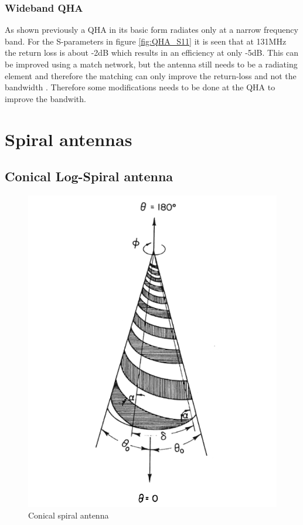\subsubsection{Wideband QHA}
As shown previously a QHA in its basic form radiates only at a narrow frequency band. For the S-parameters in figure \ref{fig:QHA_S11} it is seen that at 131MHz the return loss is about -2dB which results in an efficiency at only -5dB. This can be improved using a match network, but the antenna still needs to be a radiating element and therefore the matching can only improve the return-loss and not the bandwidth \citep{Iyver2010}. Therefore some modifications needs to be done at the QHA to improve the bandwith.     



\section{Spiral antennas}


\subsection{Conical Log-Spiral antenna}

\begin{figure}[H]
\centering 
\includegraphics[scale = 0.5]{figures/antennas/spiral/conical_spiral}
\caption{Conical spiral antenna \citep{Rumsey1966}}
\label{fig:con_spi}
\end{figure}


